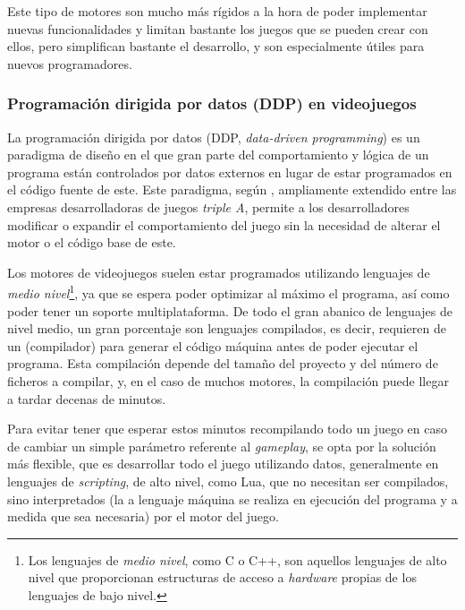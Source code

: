 \smallskip

Este tipo de motores son mucho más rígidos a la hora de poder implementar nuevas funcionalidades y limitan bastante los juegos que se pueden crear con ellos, pero simplifican bastante el desarrollo, y son especialmente útiles para nuevos programadores.

\subsubsection{Programación dirigida por datos (DDP) en videojuegos}
\label{sec:ddp}
La programación dirigida por datos (DDP, \textit{data-driven programming}) es un paradigma de diseño en el que gran parte del comportamiento y lógica de un programa están controlados por datos externos en lugar de estar programados en el código fuente de este. Este paradigma, según \citeauthor{gregory2018game}, ampliamente extendido entre las empresas desarrolladoras de juegos \textit{triple A}, permite a los desarrolladores modificar o expandir el comportamiento del juego sin la necesidad de alterar el motor o el código base de este.

\medskip

Los motores de videojuegos suelen estar programados utilizando lenguajes de \textit{medio nivel}\footnote{Los lenguajes de \textit{medio nivel}, como C o C++, son aquellos lenguajes de alto nivel que proporcionan estructuras de acceso a \textit{hardware} propias de los lenguajes de bajo nivel.}, ya que se espera poder optimizar al máximo el programa, así como poder tener un soporte multiplataforma. De todo el gran abanico de lenguajes de nivel medio, un gran porcentaje son lenguajes compilados, es decir, requieren de un  (compilador) para generar el código máquina antes de poder ejecutar el programa. Esta compilación depende del tamaño del proyecto y del número de ficheros a compilar, y, en el caso de muchos motores, la compilación puede llegar a tardar decenas de minutos.

\smallskip

Para evitar tener que esperar estos minutos recompilando todo un juego en caso de cambiar un simple parámetro referente al \textit{gameplay}, se opta por la solución más flexible, que es desarrollar todo el juego utilizando datos, generalmente en lenguajes de \textit{scripting}, de alto nivel, como Lua, que no necesitan ser compilados, sino interpretados (la  a lenguaje máquina se realiza en ejecución del programa y a medida que sea necesaria) por el motor del juego.

